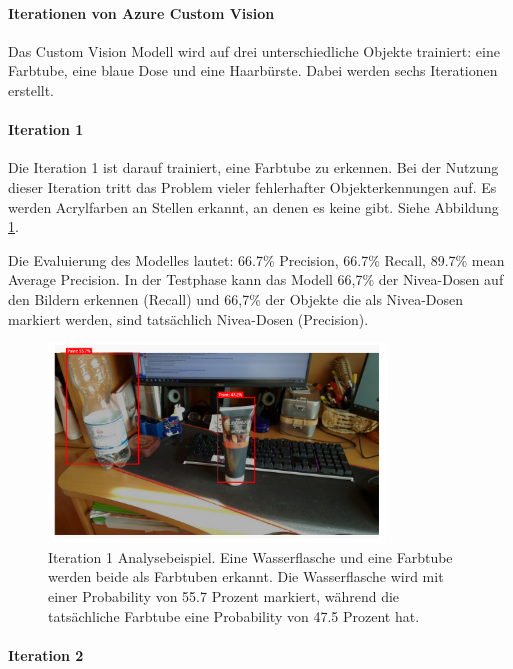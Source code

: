 \paragraph{Iterationen von Azure Custom Vision}

Das Custom Vision Modell wird auf drei unterschiedliche Objekte trainiert: eine Farbtube, eine blaue Dose und eine Haarbürste. Dabei werden sechs Iterationen erstellt. 

\paragraph{Iteration 1}

Die Iteration 1 ist darauf trainiert, eine Farbtube zu erkennen. Bei der Nutzung dieser Iteration tritt das Problem vieler fehlerhafter Objekterkennungen auf. Es werden Acrylfarben an Stellen erkannt, an denen es keine gibt. Siehe Abbildung \ref{image:customVisionPaint}. 

Die Evaluierung des Modelles lautet: 66.7\% Precision, 66.7\% Recall, 89.7\% mean Average Precision.
In der Testphase kann das Modell 66,7\% der Nivea-Dosen auf den Bildern erkennen (Recall) und 66,7\% der Objekte die als Nivea-Dosen markiert werden, sind tatsächlich Nivea-Dosen (Precision).

\begin{figure}[H]
	\centering
	\includegraphics[width=0.8\textwidth]{images/customVisionPaint.PNG}
	\caption[Iteration 1 Analysebeispiel]{Iteration 1 Analysebeispiel. Eine Wasserflasche und eine Farbtube werden beide als Farbtuben erkannt. Die Wasserflasche wird mit einer Probability von 55.7 Prozent markiert, während die tatsächliche Farbtube eine Probability von 47.5 Prozent hat.}
	\label{image:customVisionPaint}
\end{figure}

\paragraph{Iteration 2}

